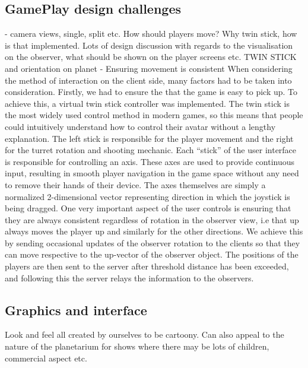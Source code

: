 \documentclass[11pt,a4paper]{article}
\begin{document}
     \subsection{GamePlay design challenges}
      - camera views, single, split etc. How should players move? Why twin stick, how is that implemented. Lots of design discussion with regards to the visualisation on the observer, what should be shown on the player screens etc.
      TWIN STICK and orientation on planet
       - Ensuring movement is consistent
       When considering the method of interaction on the client side, many factors had to be taken into consideration. Firstly, we had to ensure the that the game is easy to pick up. To achieve this, a virtual twin stick controller was implemented. The twin stick is the most widely used control method in modern games, so this means that people could intuitively understand how to control their avatar without a lengthy explanation. The left stick is responsible for the player movement and the right for the turret rotation and shooting mechanic. 
       Each “stick” of the user interface is responsible for controlling an axis. These axes are used to provide continuous input, resulting in smooth player navigation in the game space without any need to remove their hands of their device. The axes themselves are simply a normalized 2-dimensional vector representing direction in which the joystick is being dragged.
       One very important aspect of the user controls is ensuring that they are always consistent regardless of rotation in the observer view, i.e that up always moves the player up and similarly for the other directions. We achieve this by sending occasional updates of the observer rotation to the clients so that they can move respective to the up-vector of the observer object. The positions of the players are then sent to the server after threshold distance has been exceeded, and following this the server relays the information to the observers.

       \pagebreak
       \subsection{Graphics and interface}
       Look and feel all created by ourselves to be cartoony.
        Can also appeal to the nature of the planetarium for shows where there may be lots of children, commercial aspect etc.
\end{document}
